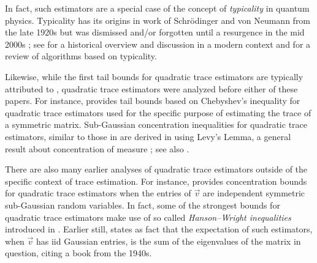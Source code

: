 In fact, such estimators are a special case of the concept of \emph{typicality} in quantum physics.
Typicality has its origins in work of Schr\"odinger \cite{schrodinger_27} and von Neumann \cite{vonneumann_29} from the late 1920s but was dismissed and/or forgotten until a resurgence in the mid 2000s \cite{gemmer_michel_mahler_09,goldstein_lebowitz_tumulka_zanghi_06,popescu_short_winter_06,reimann_07};
see \cite{goldstein_lebowitz_mastrodonato_tumulka_zanghi_10} for a historical overview and discussion in a modern context and \cite{jin_willsch_willsch_lagemann_michielsen_deraedt_21} for a review of algorithms based on typicality.




Likewise, while the first tail bounds for quadratic trace estimators are typically attributed to \cite{avron_toledo_11,roostakhorasani_ascher_14}, quadratic trace estimators were analyzed before either of these papers.
For instance, \cite{reimann_07} provides tail bounds based on Chebyshev's inequality for quadratic trace estimators used for the specific purpose of estimating the trace of a symmetric matrix.
Sub-Gaussian concentration inequalities for quadratic trace estimators, similar to those in \cite{avron_toledo_11,roostakhorasani_ascher_14} are derived in \cite{popescu_short_winter_06} using Levy's Lemma, a general result about concentration of measure \cite{ledoux_01}; see also \cite[Theorem 2.2.2]{gogolin_10}.


There are also many earlier analyses of quadratic trace estimators outside of the specific context of trace estimation.
For instance, \cite{hanson_wright_71} provides concentration bounds for quadratic trace estimators when the entries of \( \vec{v} \) are independent symmetric sub-Gaussian random variables. 
In fact, some of the strongest bounds for quadratic trace estimators \cite{meyer_musco_musco_woodruff_21,persson_cortinovis_kressner_22} make use of so called \emph{Hanson--Wright inequalities} \cite{rudelson_vershynin_13} introduced in \cite{hanson_wright_71}.
Earlier still, \cite{grenander_pollak_slepian_59} states as fact that the expectation of such estimators, when \( \vec{v} \) has iid Gaussian entries, is the sum of the eigenvalues of the matrix in question, citing a book \cite{cramer_46} from the 1940s. 



